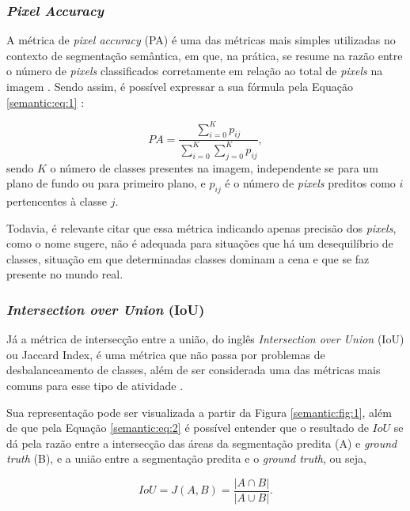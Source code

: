 \subsubsection{\textit{Pixel Accuracy}}
\label{semantic:pa}
A métrica de \textit{pixel accuracy} (PA) é uma das métricas mais simples utilizadas no contexto de segmentação semântica, em que, na prática, se resume na razão entre o número de \textit{pixels} classificados corretamente em relação ao total de \textit{pixels} na imagem \citep{Minaee2021}. Sendo assim, é possível expressar a sua fórmula pela Equação \ref{semantic:eq:1} \citep{Minaee2021}:

\begin{equation}
    \label{semantic:eq:1}
    PA = \frac{\sum_{i=0}^{K} p_{ij}}{\sum_{i=0}^{K} \sum_{j=0}^{K} p_{ij}},
\end{equation}
sendo $K$ o número de classes presentes na imagem, independente se para um plano de fundo ou para primeiro plano, e $p_{ij}$ é o número de \textit{pixels} preditos como $i$ pertencentes à classe $j$.

Todavia, é relevante citar que essa métrica indicando apenas precisão dos \textit{pixels}, como o nome sugere, não é adequada para situações que há um desequilíbrio de classes, situação em que determinadas classes dominam a cena e que se faz presente no mundo real.


\subsubsection{\textit{Intersection over Union} (IoU)}
\label{semantic:IoU}
Já a métrica de intersecção entre a união, do inglês \textit{Intersection over Union} (IoU) ou Jaccard Index, é uma métrica que não passa por problemas de desbalanceamento de classes, além de ser considerada uma das métricas mais comuns para esse tipo de atividade \citep{Minaee2021}.

Sua representação pode ser visualizada a partir da Figura \ref{semantic:fig:1}, além de que pela Equação \ref{semantic:eq:2} é possível entender que o resultado de $IoU$ se dá pela razão entre a intersecção das áreas da segmentação predita (A) e \textit{ground truth} (B), e a união entre a segmentação predita e o \textit{ground truth}, ou seja,

\begin{equation}
    \label{semantic:eq:2}
    IoU = J(A,B) = \frac{|A \cap B|}{|A \cup B|}.
\end{equation}


